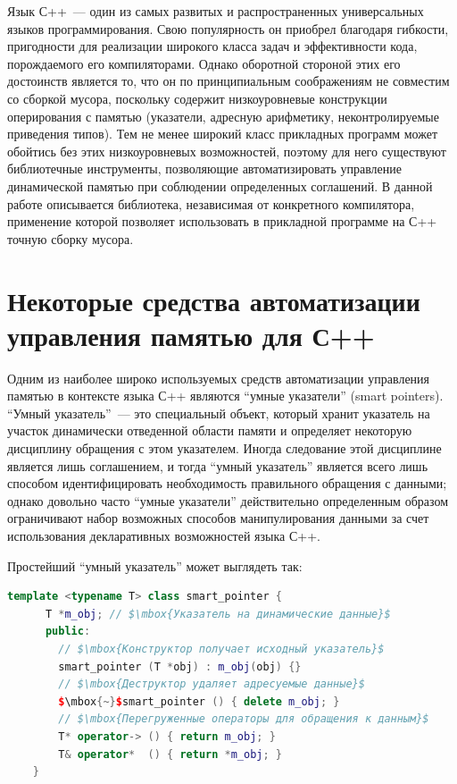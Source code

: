 Язык С++~--- один из самых развитых и распространенных универсальных языков программирования. Свою популярность он приобрел 
благодаря гибкости, пригодности для реализации широкого класса задач и эффективности кода, порождаемого его 
компиляторами. Однако оборотной стороной этих его достоинств является то, что он по принципиальным соображениям не 
совместим со сборкой мусора, поскольку содержит низкоуровневые конструкции оперирования с памятью (указатели, адресную 
арифметику, неконтролируемые приведения типов). Тем не менее широкий класс прикладных программ может обойтись без этих
низкоуровневых возможностей, поэтому для него существуют библиотечные инструменты, позволяющие автоматизировать
управление динамической памятью при соблюдении определенных соглашений. В данной работе описывается
библиотека, независимая от конкретного компилятора, применение которой позволяет использовать в прикладной
программе на С++ точную сборку мусора.
\section{Некоторые средства автоматизации\\
управления памятью для С++}

Одним из наиболее широко используемых средств автоматизации управления памятью в
контексте языка С++ являются ``умные указатели'' (smart pointers). ``Умный указатель''~---
это специальный объект, который хранит указатель на участок динамически отведенной области
памяти и определяет некоторую дисциплину обращения с этом указателем. Иногда следование
этой дисциплине является лишь соглашением, и тогда ``умный указатель'' является всего лишь
способом идентифицировать необходимость правильного обращения с данными; однако довольно часто
``умные указатели'' действительно определенным образом ограничивают набор возможных
способов манипулирования данными за счет использования декларативных возможностей языка С++.

Простейший ``умный указатель'' может выглядеть так:

\begin{lstlisting}[language=C++,mathescape=true]
    template <typename T> class smart_pointer {
      T *m_obj; // $\mbox{Указатель на динамические данные}$
      public:
        // $\mbox{Конструктор получает исходный указатель}$
        smart_pointer (T *obj) : m_obj(obj) {}
        // $\mbox{Деструктор удаляет адресуемые данные}$
        $\mbox{~}$smart_pointer () { delete m_obj; }
        // $\mbox{Перегруженные операторы для обращения к данным}$
        T* operator-> () { return m_obj; }
        T& operator*  () { return *m_obj; }
    }
\end{lstlisting}

